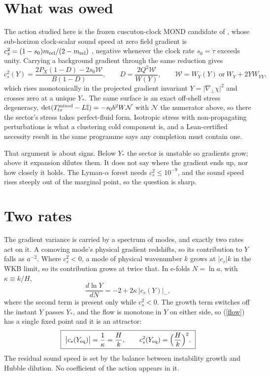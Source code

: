 \documentclass[11pt,letterpaper]{article}
\begin{document}
\section{What was owed}
The action studied here is the frozen cuscuton-clock MOND candidate of \cite{paper13}, whose sub-horizon clock-scalar sound speed at zero field gradient is $c_s^2=(1-s_0)m_{\rm rel}/(2-m_{\rm rel})$ \cite{paper17}, negative whenever the clock rate $s_0=\dot\tau$ exceeds unity. Carrying a background gradient through the same reduction \cite{paper19} gives
\begin{equation}
c_s^2(Y)=\frac{2P_X(1-D)-2s_0\mathcal{W}}{B(1-D)},\qquad D=\frac{2Q^2\mathcal{W}}{W(Y)},\qquad \mathcal{W}=W_Y(Y)\ \text{or}\ W_Y+2YW_{YY},
\end{equation}
which rises monotonically in the projected gradient invariant $Y=|\nabla_\perp\chi|^2$ and crosses zero at a unique $Y_*$. The same surface is an exact off-shell stress degeneracy, $\det(T^{\rm mixed}_{tx}-L\mathbb{I})=-s_0b^2W\mathcal{N}$ with $\mathcal{N}$ the numerator above, so there the sector's stress takes perfect-fluid form. Isotropic stress with non-propagating perturbations is what a clustering cold component is, and a Lean-certified necessity result in the same programme \cite{repo} says any completion must contain one.

That argument is about signs. Below $Y_*$ the sector is unstable so gradients grow; above it expansion dilutes them. It does not say where the gradient ends up, nor how closely it holds. The Lyman-$\alpha$ forest needs $c_s^2\le10^{-9}$, and the sound speed rises steeply out of the marginal point, so the question is sharp.

\section{Two rates}
The gradient variance is carried by a spectrum of modes, and exactly two rates act on it. A comoving mode's physical gradient redshifts, so its contribution to $Y$ falls as $a^{-2}$. Where $c_s^2<0$, a mode of physical wavenumber $k$ grows at $|c_s|k$ in the WKB limit, so its contribution grows at twice that. In e-folds $N=\ln a$, with $\kappa\equiv k/H$,
\begin{equation}
\frac{d\ln Y}{dN}=-2+2\kappa\,\big|c_s(Y)\big|_{-},
\label{flow}
\end{equation}
where the second term is present only while $c_s^2<0$. The growth term switches off the instant $Y$ passes $Y_*$, and the flow is monotone in $Y$ on either side, so (\ref{flow}) has a single fixed point and it is an attractor:
\begin{equation}
\boxed{\ \big|c_s(Y_{\rm eq})\big|=\frac{1}{\kappa}=\frac{H}{k},\qquad c_s^2(Y_{\rm eq})=\Big(\frac{H}{k}\Big)^{2}.\ }
\label{fp}
\end{equation}
The residual sound speed is set by the balance between instability growth and Hubble dilution. No coefficient of the action appears in it.
\end{document}
